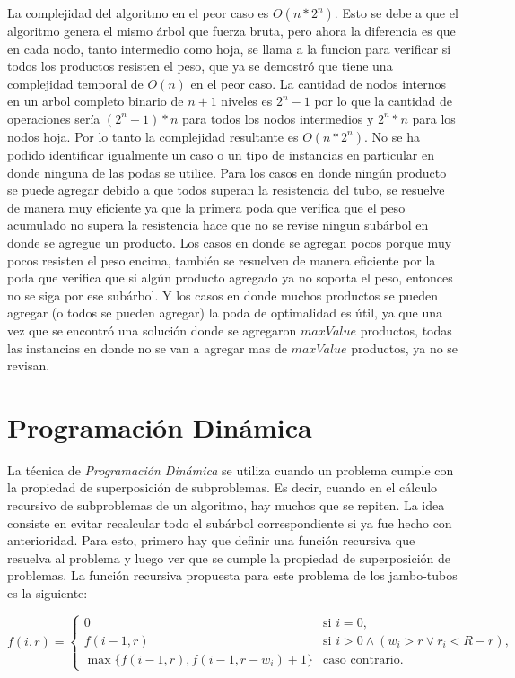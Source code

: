 \documentclass[10pt,a4paper]{article}
\begin{document}
La complejidad del algoritmo en el peor caso es $O(n*2^n)$. Esto se debe a que el algoritmo genera el mismo árbol que fuerza bruta, pero ahora la diferencia es que en cada nodo, tanto intermedio como hoja, se llama a la funcion para verificar si todos los productos resisten el peso, que ya se demostró que tiene una complejidad temporal de $O(n)$ en el peor caso. La cantidad de nodos internos en un arbol completo binario de $n + 1$ niveles es $2^n - 1$ por lo que la cantidad de operaciones sería $(2^n - 1)*n$ para todos los nodos intermedios y $2^n*n$ para los nodos hoja. Por lo tanto la complejidad resultante es $O(n*2^n)$. No se ha podido identificar igualmente un caso o un tipo de instancias en particular en donde ninguna de las podas se utilice. Para los casos en donde ningún producto se puede agregar debido a que todos superan la resistencia del tubo, se resuelve de manera muy eficiente ya que la primera poda que verifica que el peso acumulado no supera la resistencia hace que no se revise ningun subárbol en donde se agregue un producto. Los casos en donde se agregan pocos porque muy pocos resisten el peso encima, también se resuelven de manera eficiente por la poda que verifica que si algún producto agregado ya no soporta el peso, entonces no se siga por ese subárbol. Y los casos en donde muchos productos se pueden agregar (o todos se pueden agregar) la poda de optimalidad es útil, ya que una vez que se encontró una solución donde se agregaron $maxValue$ productos, todas las instancias en donde no se van a agregar mas de $maxValue$ productos, ya no se revisan.

\section{Programación Dinámica} \label{sec:dp}
La técnica de \emph{Programación Dinámica} se utiliza cuando un problema cumple con la propiedad de superposición de subproblemas. Es decir, cuando en el cálculo recursivo de subproblemas de un algoritmo, hay muchos que se repiten. La idea consiste en evitar recalcular todo el subárbol correspondiente si ya fue hecho con anterioridad. Para esto, primero hay que definir una función recursiva que resuelva al problema y luego ver que se cumple la propiedad de superposición de problemas. La función recursiva propuesta para este problema de los jambo-tubos es la siguiente: 

\begin{equation} \label{eq:dp}
    f(i, r) = \begin{cases}
        0 & \text{si } i = 0,\\
        f(i -1, r) & \text{si } i > 0 \land (w_i > r \lor r_i < R - r),\\
        \max \{ f(i-1, r), f(i-1, r - w_i) + 1 \} & \text{caso contrario. }
    \end{cases}
\end{equation}
\end{document}
